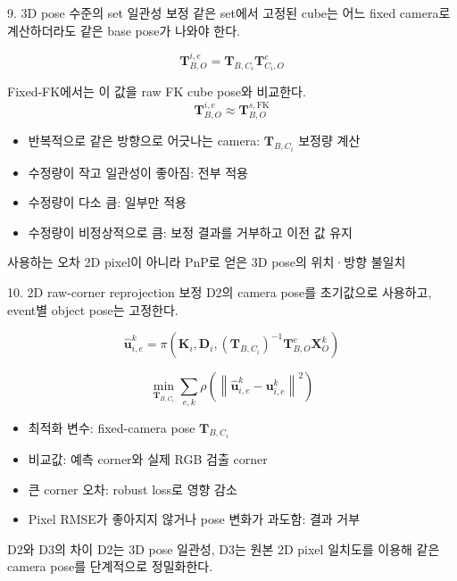 \documentclass[aspectratio=169,11pt]{beamer}
\newcommand{\T}[2]{\mathbf T_{#1,#2}}
\begin{document}
\begin{frame}{9. 3D pose 수준의 set 일관성 보정}
  같은 set에서 고정된 cube는 어느 fixed camera로 계산하더라도 같은 base pose가 나와야 한다.

  \[
    \T{B}{O}^{i,e}=\T{B}{C_i}\T{C_i}{O}^{e}
  \]

  Fixed-FK에서는 이 값을 raw FK cube pose와 비교한다.
  \[
    \T{B}{O}^{i,e}\approx\T{B}{O}^{s,\mathrm{FK}}
  \]

  \begin{itemize}
    \item 반복적으로 같은 방향으로 어긋나는 camera: $\T{B}{C_i}$ 보정량 계산
    \item 수정량이 작고 일관성이 좋아짐: 전부 적용
    \item 수정량이 다소 큼: 일부만 적용
    \item 수정량이 비정상적으로 큼: 보정 결과를 거부하고 이전 값 유지
  \end{itemize}

  \begin{block}{사용하는 오차}
    2D pixel이 아니라 PnP로 얻은 3D pose의 위치·방향 불일치
  \end{block}
\end{frame}

\begin{frame}{10. 2D raw-corner reprojection 보정}
  D2의 camera pose를 초기값으로 사용하고, event별 object pose는 고정한다.

  \[
    \widehat{\mathbf u}_{i,e}^{k}
    =\pi\!\left(
      \mathbf K_i,\mathbf D_i,
      \left(\T{B}{C_i}\right)^{-1}\T{B}{O}^{e}\mathbf X_O^k
    \right)
  \]

  \[
    \min_{\T{B}{C_i}}
    \sum_{e,k}\rho\!\left(
      \left\|\widehat{\mathbf u}_{i,e}^{k}-\mathbf u_{i,e}^{k}\right\|^2
    \right)
  \]

  \begin{itemize}
    \item 최적화 변수: fixed-camera pose $\T{B}{C_i}$
    \item 비교값: 예측 corner와 실제 RGB 검출 corner
    \item 큰 corner 오차: robust loss로 영향 감소
    \item Pixel RMSE가 좋아지지 않거나 pose 변화가 과도함: 결과 거부
  \end{itemize}

  \begin{alertblock}{D2와 D3의 차이}
    D2는 3D pose 일관성, D3는 원본 2D pixel 일치도를 이용해 같은 camera pose를 단계적으로 정밀화한다.
  \end{alertblock}
\end{frame}
\end{document}
